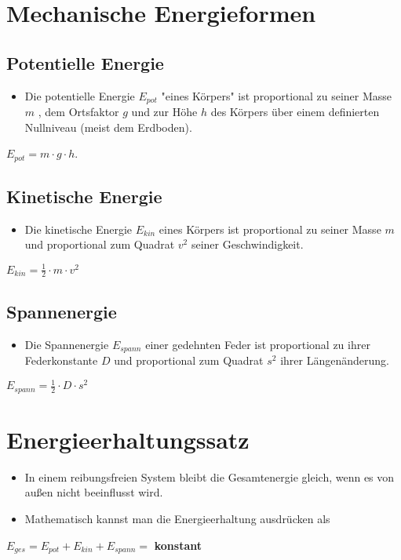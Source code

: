 \documentclass{article}
\begin{document}
\section*{Mechanische Energieformen}
\subsection*{Potentielle Energie}
\begin{itemize}
	\item Die potentielle Energie $E_{pot}$ "eines Körpers" ist proportional zu seiner Masse $m$ , dem Ortsfaktor $g$ und zur Höhe $h$ des Körpers über einem definierten Nullniveau (meist dem Erdboden).
\end{itemize}
\begin{center}
	$E_{pot} = m \cdot g \cdot h$.
\end{center}
\subsection*{Kinetische Energie}
\begin{itemize}
	\item Die kinetische Energie $E_{kin}$ eines Körpers ist proportional zu seiner Masse $m$ und proportional zum Quadrat $v^2$ seiner Geschwindigkeit.
\end{itemize}
\begin{center}
	$E_{kin} = \frac{1}{2} \cdot m \cdot v^2$
\end{center}
\subsection*{Spannenergie}
\begin{itemize}
	\item Die Spannenergie $E_{spann}$ einer gedehnten Feder ist proportional zu ihrer Federkonstante $D$ und proportional zum Quadrat $s^2$ ihrer Längenänderung.
\end{itemize}
\begin{center}
	$E_{spann} = \frac{1}{2} \cdot D \cdot s^2$
\end{center}
\section*{Energieerhaltungssatz}
\begin{itemize}
	\item In einem reibungsfreien System bleibt die Gesamtenergie gleich, wenn es von außen nicht beeinflusst wird.
	\item Mathematisch kannst man die Energieerhaltung ausdrücken als
\end{itemize}
\begin{center}
	$E_{ges} = E_{pot} + E_{kin} + E_{spann} = $ \textbf{konstant}
\end{center}
\end{document}
